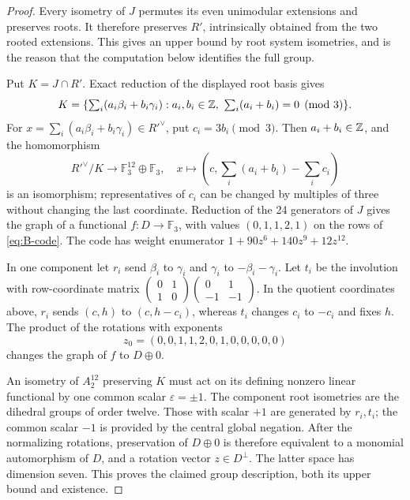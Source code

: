 \begin{proof}
Every isometry of \(J\) permutes its even unimodular extensions and
preserves roots. It therefore preserves \(R'\), intrinsically obtained
from the two rooted extensions. This gives an upper bound by root
system isometries, and is the reason that the computation below
identifies the full group.

Put \(K=J\cap R'\). Exact reduction of the displayed root basis gives
\[
 K=\{\textstyle\sum_i(a_i\beta_i+b_i\gamma_i):
       a_i,b_i\in\mathbb Z,\ \sum_i(a_i+b_i)=0\pmod3\}.
\]
For \(x=\sum_i(a_i\beta_i+b_i\gamma_i)\in R'^\vee\), put
\(c_i=3b_i\pmod3\). Then \(a_i+b_i\in\mathbb Z\), and the homomorphism
\[
 R'^\vee/K\longrightarrow\mathbb F_3^{12}\oplus\mathbb F_3,
 \quad x\longmapsto
 \left(c,\sum_i(a_i+b_i)-\sum_i c_i\right)
\]
is an isomorphism; representatives of \(c_i\) can be changed by
multiples of three without changing the last coordinate. Reduction of
the 24 generators of \(J\) gives the graph of a functional \(f:D\to
\mathbb F_3\), with values \((0,1,1,2,1)\) on the rows of
\eqref{eq:B-code}. The code has weight enumerator
\(1+90z^6+140z^9+12z^{12}\).

In one component let \(r_i\) send \(\beta_i\) to \(\gamma_i\)
and \(\gamma_i\) to \(-\beta_i-\gamma_i\). Let \(t_i\) be the
involution with row-coordinate matrix
\(\left(\begin{smallmatrix}0&1\\1&0\end{smallmatrix}\right)
\left(\begin{smallmatrix}0&1\\-1&-1\end{smallmatrix}\right)\).
In the quotient coordinates above, \(r_i\) sends
\((c,h)\) to \((c,h-c_i)\), whereas \(t_i\) changes \(c_i\) to
\(-c_i\) and fixes \(h\). The product of the rotations with exponents
\[
 z_0=(0,0,1,1,2,0,1,0,0,0,0,0)
\]
changes the graph of \(f\) to \(D\oplus0\).

An isometry of \(A_2^{12}\) preserving \(K\) must act on its defining
nonzero linear functional by one common scalar \(\varepsilon=\pm1\).
The component root isometries are the dihedral groups of order twelve.
Those with scalar \(+1\) are generated by \(r_i,t_i\); the common
scalar \(-1\) is provided by the central global negation. After the
normalizing rotations, preservation of \(D\oplus0\) is therefore
equivalent to a monomial automorphism of \(D\), and a rotation vector
\(z\in D^\perp\). The latter space has dimension seven. This proves
the claimed group description, both its upper bound and existence.


\end{proof}
